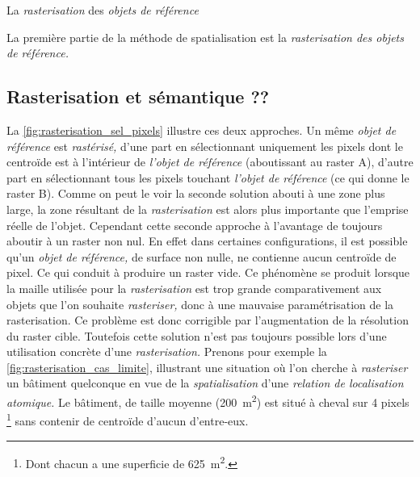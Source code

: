 La \emph{rasterisation} des \emph{objets de référence}

La première partie de la méthode de spatialisation est la
\emph{rasterisation des objets de référence.}



\subsection{Rasterisation et sémantique ??}



La \autoref{fig:rasterisation_sel_pixels} illustre ces deux approches. Un même \emph{objet de référence} est \emph{rastérisé,} d'une part en sélectionnant uniquement les pixels dont le centroïde est à l'intérieur de \emph{l'objet de référence} (aboutissant au raster \textcolor{RdBu-9-1}{\textsf{A}}), d'autre part en sélectionnant tous les pixels touchant \emph{l'objet de référence} (ce qui donne le raster \textcolor{RdBu-9-9}{\textsf{B}}). Comme on peut le voir la seconde solution abouti à une zone plus large, la zone résultant de la \emph{rasterisation} est alors plus importante que l'emprise réelle de l'objet. Cependant cette seconde approche à l'avantage de toujours aboutir à un raster non nul. En effet dans certaines configurations, il est possible qu'un \emph{objet de référence,} de surface non nulle, ne contienne aucun centroïde de pixel. Ce qui conduit à produire un raster vide. Ce phénomène se produit lorsque la maille utilisée pour la \emph{rasterisation} est trop grande comparativement aux objets que l'on souhaite \emph{rasteriser,} donc à une mauvaise paramétrisation de la rasterisation. Ce problème est donc corrigible par l'augmentation de la résolution du raster cible. Toutefois cette solution n'est pas toujours possible lors d'une utilisation concrète d'une \emph{rasterisation.} Prenons pour exemple la \autoref{fig:rasterisation_cas_limite}, illustrant une situation où l'on cherche à \emph{rasteriser} un bâtiment quelconque en vue de la \emph{spatialisation} d'une \emph{relation de localisation atomique.} Le bâtiment, de taille moyenne (\ie \SI{200}{\metre\squared}) est situé à cheval sur 4 pixels \footnote{Dont chacun a une superficie de \SI{625}{\metre\squared}.} sans contenir de centroïde d'aucun d'entre-eux.

